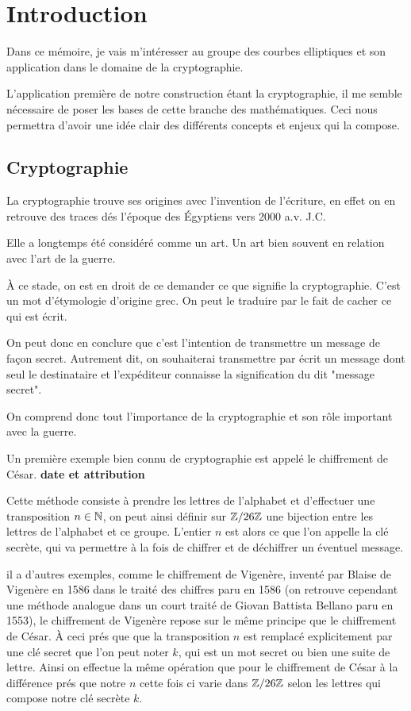 \chapter{Introduction}

Dans ce mémoire, je vais m'intéresser au groupe des courbes elliptiques et son application dans le
domaine de la cryptographie.

L'application première de notre construction étant la cryptographie, il me semble nécessaire de
poser les bases de cette branche des mathématiques. Ceci nous permettra d'avoir une idée clair
des différents concepts et enjeux qui la compose.

\section{Cryptographie}

La cryptographie trouve ses origines avec l'invention de l'écriture, en effet on en
retrouve des traces dés l'époque des Égyptiens vers 2000 a.v. J.C.

Elle a longtemps été considéré comme un art. Un art bien souvent en relation avec l'art de
la guerre.

À ce stade, on est en droit de ce demander ce que signifie la cryptographie. C'est un mot
d'étymologie d'origine grec. On peut le traduire par le fait de cacher ce qui est écrit.

On peut donc en conclure que c'est l'intention de transmettre un message de façon secret.
Autrement dit, on souhaiterai transmettre par écrit un message dont seul le destinataire
et l'expéditeur connaisse la signification du dit "message secret". 

On comprend donc tout l'importance de la cryptographie et son rôle important avec la
guerre.

Un première exemple bien connu de cryptographie est appelé le chiffrement de César. 
\textbf{date et attribution}

Cette méthode consiste à
prendre les lettres de l'alphabet et d'effectuer une transposition $n \in \mathbb{N}$, on peut
ainsi définir sur $\mathbb{Z} / 26\mathbb{Z}$ une bijection entre les lettres de l'alphabet et ce groupe.
L'entier $n$ est alors ce que l'on appelle la clé secrète, qui va permettre à la fois de
chiffrer et de déchiffrer un éventuel message.

il a d'autres exemples, comme le chiffrement de Vigenère, inventé par Blaise de Vigenère en
1586 dans le traité des chiffres paru en 1586 (on retrouve cependant une méthode analogue
dans un court traité de Giovan Battista Bellano paru en 1553), le chiffrement de Vigenère repose sur le même principe que
le chiffrement de César. À ceci prés que que la transposition $n$ est remplacé explicitement
par une clé secret que l'on peut noter $k$, qui est un mot secret ou bien une suite de lettre.
Ainsi on effectue la même opération que pour le chiffrement de César à la différence prés que
notre $n$ cette fois ci varie dans $\mathbb{Z} / 26\mathbb{Z}$ selon les lettres qui compose notre clé secrète $k$.

